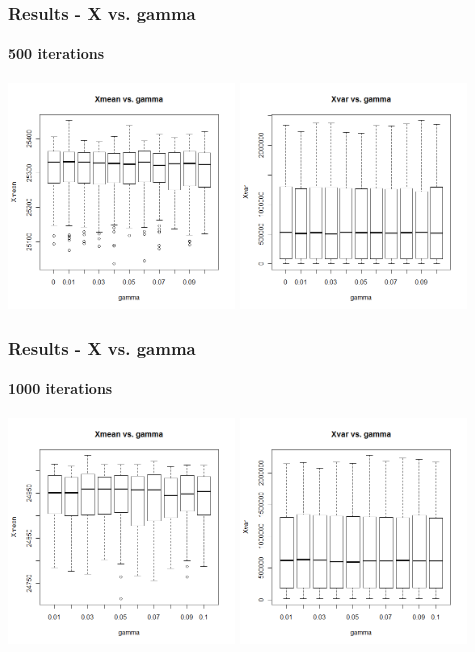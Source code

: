 \begin{frame}
    \frametitle{Results - X vs. gamma }
	\framesubtitle{500 iterations}
\hspace*{-5mm}
\includegraphics[height=6cm]{boxplot500_xmean_gamma}
\includegraphics[height=6cm]{boxplot500_xvar_gamma}
\end{frame}

\begin{frame}
    \frametitle{Results - X vs. gamma }
	\framesubtitle{1000 iterations}
\hspace*{-5mm}
\includegraphics[height=6cm]{boxplot1000_xmean_gamma}
\includegraphics[height=6cm]{boxplot1000_xvar_gamma}
\end{frame}





